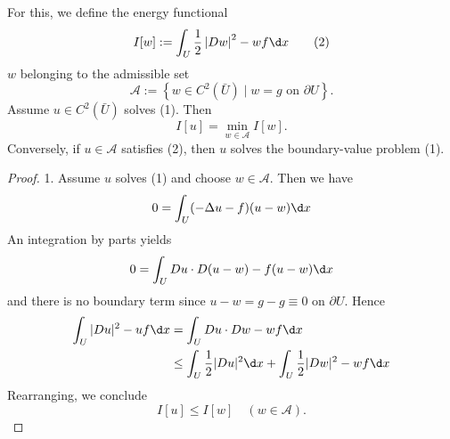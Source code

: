 \begin{theorem}
    For this, we define the energy functional
    \begin{equation*}
        I[w]:=\int_U \frac{1}{2}\left|D w\right|^2-w f \\ \d x
        \tag{2}
    \end{equation*}
    $w$ belonging to the admissible set
    \begin{equation*}
        \mathcal{A}:=\left\{w \in C^2(\bar{U}) \mid w=g \text { on } \partial U\right\} .
    \end{equation*}
    Assume $u \in C^2(\bar{U})$ solves (1). Then
    \begin{equation*}
        I[u]=\min _{w \in \mathcal{A}} I[w] .
    \end{equation*}
    Conversely, if $u \in \mathcal{A}$ satisfies (2), then $u$ solves the boundary-value problem (1).
    \begin{proof}
        1. Assume $u$ solves (1) and choose $w \in \mathcal{A}$. Then we have
        \begin{equation*}
            0=\int_U(-\Delta u-f)(u-w) \d x
        \end{equation*}
        An integration by parts yields
        \begin{equation*}
            0=\int_U D u \cdot D(u-w)-f(u-w) \d x
        \end{equation*}
        and there is no boundary term since $u-w=g-g\equiv 0$ on $\partial U$. Hence
        \begin{equation*}
            \begin{aligned}
                \int_U|D u|^2-u f \d x & =\int_U D u \cdot D w-w f \d x                                         \\
                                       & \leq \int_U \frac{1}{2}|D u|^2 \d x+\int_U \frac{1}{2}|D w|^2-w f \d x
            \end{aligned}
        \end{equation*}
        Rearranging, we conclude
        \begin{equation*}
            I[u] \leq I[w] \quad(w \in \mathcal{A}) .
        \end{equation*}


\end{proof}
\end{theorem}
